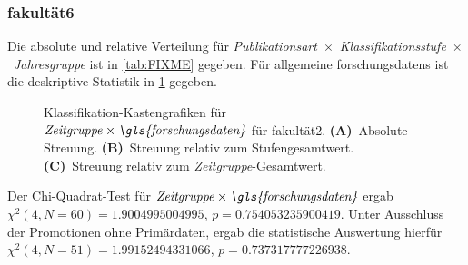 \subsubsection{\gls{fakultät6}}
Die absolute und relative Verteilung für {\textit{Publikationsart}}~$\times$~{\textit{Klassifikationsstufe}}~$\times$~\textit{Jahresgruppe} ist in \cref{tab:FIXME} gegeben.
Für allgemeine \glspl{forschungsdaten} ist die deskriptive Statistik in \cref{fig:faculty_e_sampled_evaluated_adjusted_factors-only_Zeitgruppe_x_FD_absolute_boxplot} gegeben.
\begin{figure}[!htbp]
    \centering%
    \resizebox{.33\textwidth}{!}{}%
    \resizebox{.33\textwidth}{!}{}%
    \resizebox{.33\textwidth}{!}{}%
    \caption{Klassifikation-Kastengrafiken für $\text{\textit{Zeitgruppe}}\times\text{\textit{\gls{forschungsdaten}}}$ für \gls{fakultät2}. \textbf{(A)}~Absolute Streuung. \textbf{(B)}~Streuung relativ zum Stufengesamtwert. \textbf{(C)}~Streuung relativ zum \textit{Zeitgruppe}-Gesamtwert.}
    \label{fig:faculty_e_sampled_evaluated_adjusted_factors-only_Zeitgruppe_x_FD_absolute_boxplot}
\end{figure}
Der Chi-Quadrat-Test für $\text{\textit{Zeitgruppe}}\times\text{\textit{\gls{forschungsdaten}}}$ ergab $\chi^2 (\num{4}, N = \num{60}) = \num[round-mode=places,round-precision=3]{1.9004995004995}$, $p = \num[round-mode=places,round-precision=3]{0.754053235900419}$.
Unter Ausschluss der Promotionen ohne Primärdaten, ergab die statistische Auswertung hierfür $\chi^2 (\num{4}, N = \num{51}) = \num[round-mode=places,round-precision=3]{1.99152494331066}$, $p = \num[round-mode=places,round-precision=3]{0.737317777226938}$.


